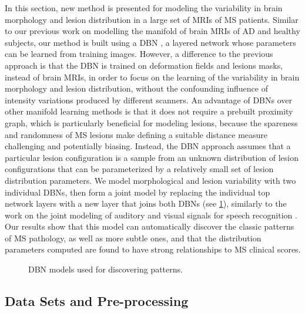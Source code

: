 In this section, new method is presented for modeling the variability in brain
morphology and lesion distribution in a large set of MRIs of MS patients.
Similar to our previous work on modelling the manifold of brain MRIs of AD and
healthy subjects, our method is built using a DBN \citep{hinton2006b}, a layered
network whose parameters can be learned from training images. However, a
difference to the previous approach is that the DBN is trained on deformation
fields and lesions masks, instead of brain MRIs, in order to focus on the
learning of the variability in brain morphology and lesion distribution, without
the confounding influence of intensity variations produced by different
scanners. An advantage of DBNs over other manifold learning methods is that it
does not require a prebuilt proximity graph, which is particularly beneficial
for modeling lesions, because the spareness and randomness of MS lesions make
defining a suitable distance measure challenging and potentially biasing.
Instead, the DBN approach assumes that a particular lesion configuration is a
sample from an unknown distribution of lesion configurations that can be
parameterized by a relatively small set of lesion distribution parameters. We
model morphological and lesion variability with two individual DBNs, then form a
joint model by replacing the individual top network layers with a new layer that
joins both DBNs (see \ref{fig:msdbnmodel}), similarly to the work on the joint
modeling of auditory and visual signals for speech recognition
\citep{ngiam2011}. Our results show that this model can automatically discover
the classic patterns of MS pathology, as well as more subtle ones, and that the
distribution parameters computed are found to have strong relationships to MS
clinical scores.

\begin{figure}[tb]
\centering

\caption{DBN models used for discovering patterns.}
\label{fig:msdbnmodel}
\end{figure}


\subsection[Data sets and pre-processing]{Data Sets and Pre-processing}


